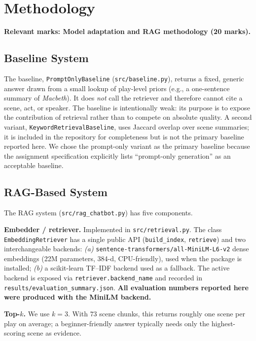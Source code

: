 \documentclass[10pt,twocolumn,a4paper]{article}
\begin{document}
\section{Methodology}
\label{sec:methodology}

\textbf{Relevant marks: Model adaptation and RAG methodology (20 marks).}

\subsection{Baseline System}

The baseline, \verb|PromptOnlyBaseline| (\verb|src/baseline.py|),
returns a fixed, generic answer drawn from a small lookup of
play-level priors (e.g., a one-sentence summary of \emph{Macbeth}).
It does \emph{not} call the retriever and therefore cannot cite a
scene, act, or speaker. The baseline is intentionally weak: its
purpose is to expose the contribution of retrieval rather than to
compete on absolute quality. A second variant,
\verb|KeywordRetrievalBaseline|, uses Jaccard overlap over scene
summaries; it is included in the repository for completeness but is
not the primary baseline reported here. We chose the prompt-only
variant as the primary baseline because the assignment specification
explicitly lists ``prompt-only generation'' as an acceptable baseline.

\subsection{RAG-Based System}

The RAG system (\verb|src/rag_chatbot.py|) has five components.

\textbf{Embedder / retriever.} Implemented in
\verb|src/retrieval.py|. The class \verb|EmbeddingRetriever| has a
single public API (\verb|build_index|, \verb|retrieve|) and two
interchangeable backends:
\textit{(a)} \verb|sentence-transformers/all-MiniLM-L6-v2| dense
embeddings (22M parameters, 384-d, CPU-friendly), used when the
package is installed;
\textit{(b)} a scikit-learn TF--IDF backend used as a fallback. The
active backend is exposed via \verb|retriever.backend_name| and
recorded in \verb|results/evaluation_summary.json|. \textbf{All
evaluation numbers reported here were produced with the MiniLM
backend.}

\textbf{Top-$k$.} We use $k = 3$. With $73$ scene chunks, this returns
roughly one scene per play on average; a beginner-friendly answer
typically needs only the highest-scoring scene as evidence.
\end{document}
